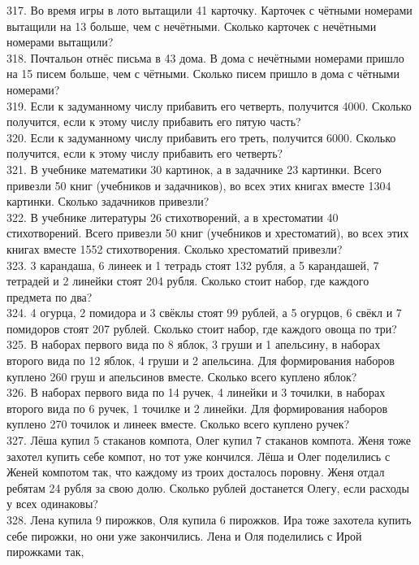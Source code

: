 317. Во время игры в лото вытащили 41 карточку. Карточек с чётными номерами вытащили на 13 больше, чем с нечётными. Сколько карточек с нечётными номерами вытащили?\\
318. Почтальон отнёс письма в 43 дома. В дома с нечётными номерами пришло на 15 писем больше, чем с чётными. Сколько писем пришло в дома с чётными номерами?\\
319. Если к задуманному числу прибавить его четверть, получится 4000. Сколько получится, если к этому числу прибавить его пятую часть?\\
320. Если к задуманному числу прибавить его треть, получится 6000. Сколько получится, если к этому числу прибавить его четверть?\\
321. В учебнике математики 30 картинок, а в задачнике 23 картинки. Всего привезли 50 книг (учебников и задачников), во всех этих книгах вместе 1304 картинки.
Сколько задачников привезли?\\
322. В учебнике литературы 26 стихотворений, а в хрестоматии 40 стихотворений. Всего привезли 50 книг (учебников и хрестоматий), во всех этих книгах вместе
1552 стихотворения. Сколько хрестоматий привезли?\\
323. 3 карандаша, 6 линеек и 1 тетрадь стоят 132 рубля, а 5 карандашей, 7 тетрадей и 2 линейки стоят 204 рубля. Сколько стоит набор, где каждого предмета по два?\\
324. 4 огурца, 2 помидора и 3 свёклы стоят 99 рублей, а 5 огурцов, 6 свёкл и 7 помидоров стоят 207 рублей. Сколько стоит набор, где каждого овоща по три?\\
325. В наборах первого вида по 8 яблок, 3 груши и 1 апельсину, в наборах второго вида по 12 яблок, 4 груши и 2 апельсина. Для формирования наборов куплено
260 груш и апельсинов вместе. Сколько всего куплено яблок?\\
326. В наборах первого вида по 14 ручек, 4 линейки и 3 точилки, в наборах второго вида по 6 ручек, 1 точилке и 2 линейки. Для формирования наборов куплено
270 точилок и линеек вместе. Сколько всего куплено ручек?\\
327. Лёша купил 5 стаканов компота, Олег купил 7 стаканов компота. Женя тоже захотел купить себе компот, но тот уже кончился. Лёша и Олег поделились с Женей компотом так, что каждому из троих досталось поровну. Женя отдал ребятам 24 рубля за свою долю. Сколько рублей достанется Олегу, если расходы у всех одинаковы?\\
328. Лена купила 9 пирожков, Оля купила 6 пирожков. Ира тоже захотела купить себе пирожки, но они уже закончились. Лена и Оля поделились с Ирой пирожками так,

